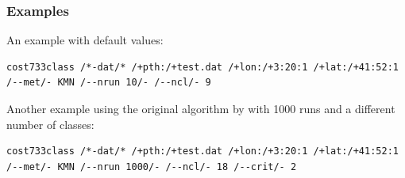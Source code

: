 \documentclass[12pt, oneside, a4paper, headsepline, plainheadsepline]{scrbook}
\begin{document}
\subsubsection*{Examples}
An example with default values:
\begin{lstlisting}
cost733class /*-dat/* /+pth:/+test.dat /+lon:/+3:20:1 /+lat:/+41:52:1 /--met/- KMN /--nrun 10/- /--ncl/- 9
\end{lstlisting}
Another example using the original algorithm by \citet{Hartigan1979} with 1000 runs and a different number of classes:
\begin{lstlisting}
cost733class /*-dat/* /+pth:/+test.dat /+lon:/+3:20:1 /+lat:/+41:52:1 /--met/- KMN /--nrun 1000/- /--ncl/- 18 /--crit/- 2
\end{lstlisting}

\end{document}
